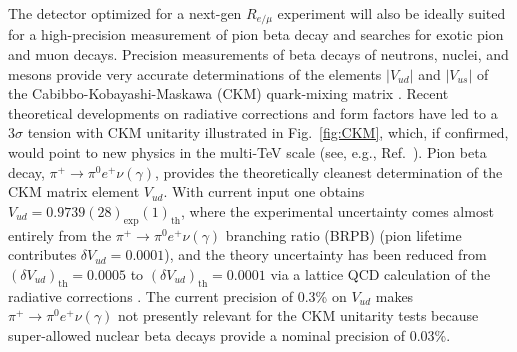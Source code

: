
The detector optimized for a next-gen $R_{e/\mu}$ experiment will also be ideally suited for a high-precision measurement of pion beta decay and searches for exotic pion and muon decays. Precision measurements of beta decays of neutrons,
nuclei, and mesons provide very accurate determinations of the elements $|V_{ud}|$ and $|V_{us}|$ of the
Cabibbo-Kobayashi-Maskawa (CKM) quark-mixing matrix \cite{Cabibbo, Kobayashi}. Recent theoretical
developments on radiative corrections and form factors have led to a $3\sigma$ tension with CKM
unitarity illustrated in Fig.~\ref{fig:CKM}, which, if confirmed, would point to new physics in the multi-TeV scale (see, e.g., Ref.~\cite{Czarnecki}).  
Pion beta decay, $\pi^+ \rightarrow \pi^0 e^+ \nu (\gamma)$, provides the theoretically cleanest determination of the CKM matrix element $V_{ud}$. With current input one obtains $V_{ud} = 0.9739(28)_{\textrm{exp}}(1)_{\textrm{th}}$, where the experimental uncertainty comes almost entirely from the  $\pi^+ \rightarrow \pi^0 e^+ \nu (\gamma)$ branching ratio (BRPB) \cite{Pocanic4} (pion lifetime contributes ${\delta}V_{ud} = 0.0001$), and the theory uncertainty has been reduced from $({\delta}V_{ud})_{\textrm{th}} = 0.0005$ \cite{Sirlin, Cirigliano3, Passera} to $({\delta}V_{ud})_{\textrm{th}} = 0.0001$ via a lattice QCD calculation of the radiative corrections \cite{Feng}. The current precision of 0.3\% on $V_{ud}$ makes $\pi^+ \rightarrow \pi^0 e^+ \nu (\gamma)$ not presently relevant for the CKM unitarity tests because super-allowed nuclear beta decays provide a nominal precision of %
0.03\%. 



